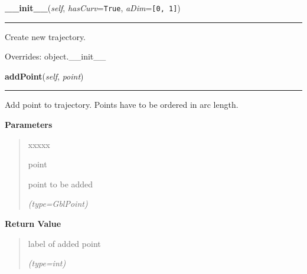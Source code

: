 \hspace{.8\funcindent}\begin{boxedminipage}{\funcwidth}

    \raggedright \textbf{\_\_init\_\_}(\textit{self}, \textit{hasCurv}={\tt True}, \textit{aDim}={\tt \texttt{[}0\texttt{, }1\texttt{]}})

    \vspace{-1.5ex}

    \rule{\textwidth}{0.5\fboxrule}
\setlength{\parskip}{2ex}
    Create new trajectory.

\setlength{\parskip}{1ex}
      Overrides: object.\_\_init\_\_

    \end{boxedminipage}

    \label{gblfit:GblTrajectory:addPoint}

    \vspace{0.5ex}

\hspace{.8\funcindent}\begin{boxedminipage}{\funcwidth}

    \raggedright \textbf{addPoint}(\textit{self}, \textit{point})

    \vspace{-1.5ex}

    \rule{\textwidth}{0.5\fboxrule}
\setlength{\parskip}{2ex}
    Add point to trajectory. Points have to be ordered in arc length.

\setlength{\parskip}{1ex}
      \textbf{Parameters}
      \vspace{-1ex}

      \begin{quote}
        \begin{Ventry}{xxxxx}

          \item[point]

          point to be added

            {\it (type=GblPoint)}

        \end{Ventry}

      \end{quote}

      \textbf{Return Value}
    \vspace{-1ex}

      \begin{quote}
      label of added point

      {\it (type=int)}

      \end{quote}

    \end{boxedminipage}

